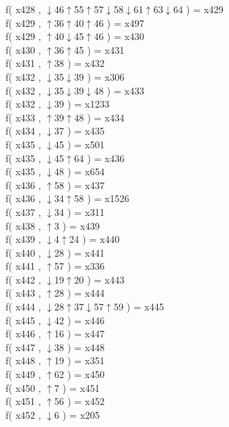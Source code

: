 f( x428 , $\downarrow$46$\uparrow$55$\uparrow$57$\downarrow$58$\downarrow$61$\uparrow$63$\downarrow$64 ) = x429 \\
f( x429 , $\uparrow$36$\uparrow$40$\uparrow$46 ) = x497 \\
f( x429 , $\uparrow$40$\downarrow$45$\uparrow$46 ) = x430 \\
f( x430 , $\uparrow$36$\uparrow$45 ) = x431 \\
f( x431 , $\uparrow$38 ) = x432 \\
f( x432 , $\downarrow$35$\downarrow$39 ) = x306 \\
f( x432 , $\downarrow$35$\downarrow$39$\downarrow$48 ) = x433 \\
f( x432 , $\downarrow$39 ) = x1233 \\
f( x433 , $\uparrow$39$\uparrow$48 ) = x434 \\
f( x434 , $\downarrow$37 ) = x435 \\
f( x435 , $\downarrow$45 ) = x501 \\
f( x435 , $\downarrow$45$\uparrow$64 ) = x436 \\
f( x435 , $\downarrow$48 ) = x654 \\
f( x436 , $\uparrow$58 ) = x437 \\
f( x436 , $\downarrow$34$\uparrow$58 ) = x1526 \\
f( x437 , $\downarrow$34 ) = x311 \\
f( x438 , $\uparrow$3 ) = x439 \\
f( x439 , $\downarrow$4$\uparrow$24 ) = x440 \\
f( x440 , $\downarrow$28 ) = x441 \\
f( x441 , $\uparrow$57 ) = x336 \\
f( x442 , $\downarrow$19$\uparrow$20 ) = x443 \\
f( x443 , $\uparrow$28 ) = x444 \\
f( x444 , $\downarrow$28$\uparrow$37$\downarrow$57$\uparrow$59 ) = x445 \\
f( x445 , $\downarrow$42 ) = x446 \\
f( x446 , $\uparrow$16 ) = x447 \\
f( x447 , $\downarrow$38 ) = x448 \\
f( x448 , $\uparrow$19 ) = x351 \\
f( x449 , $\uparrow$62 ) = x450 \\
f( x450 , $\uparrow$7 ) = x451 \\
f( x451 , $\uparrow$56 ) = x452 \\
f( x452 , $\downarrow$6 ) = x205 \\
